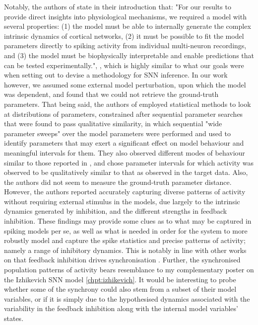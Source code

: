 \documentclass[mphil,deptreport,ianc]{infthesis} %
\begin{document}
Notably, the authors of \cite{Stringer2016InhibitoryNetworks} state in their introduction that: "For our results to provide direct insights into physiological mechanisms, we required a model with several properties: (1) the model must be able to internally generate the complex intrinsic dynamics of cortical networks, (2) it must be possible to fit the model parameters directly to spiking activity from individual multi-neuron recordings, and (3) the model must be biophysically interpretable and enable predictions that can be tested experimentally.", \cite{Stringer2016InhibitoryNetworks}, which is highly similar to what our goals were when setting out to devise a methodology for SNN inference.
In our work however, we assumed some external model perturbation, upon which the model was dependent, and found that we could not retrieve the ground-truth parameters.
That being said, the authors of \cite{Stringer2016InhibitoryNetworks} employed statistical methods to look at distributions of parameters, constrained after sequential parameter searches that were found to pass qualitative similarity, in which sequential "wide parameter sweeps" over the model parameters were performed and used to identify parameters that may exert a significant effect on model behaviour and meaningful intervals for them.
They also observed different modes of behaviour similar to those reported in \cite{Izhikevich2004}, and chose parameter intervals for which activity was observed to be qualitatively similar to that as observed in the target data.
Also, the authors did not seem to measure the ground-truth parameter distance.
However, the authors reported accurately capturing diverse patterns of activity without requiring external stimulus in the models, due largely to the intrinsic dynamics generated by inhibition, and the different strengths in feedback inhibition.
These findings may provide some clues as to what may be captured in spiking models per se, as well as what is needed in order for the system to more robustly model and capture the spike statistics and precise patterns of activity; namely a range of inhibitory dynamics.
This is notably in line with other works on that feedback inhibition drives synchronisation \cite{Pastoll2013}.
Further, the synchronised population patterns of activity bears resemblance to my complementary poster on the Izhikevich SNN model \ref{chpt:izhikevich}. It would be interesting to probe whether some of the synchrony could also stem from a subset of their model variables, or if it is simply due to the hypothesised dynamics associated with the variability in the feedback inhibition along with the internal model variables' states.
\end{document}
